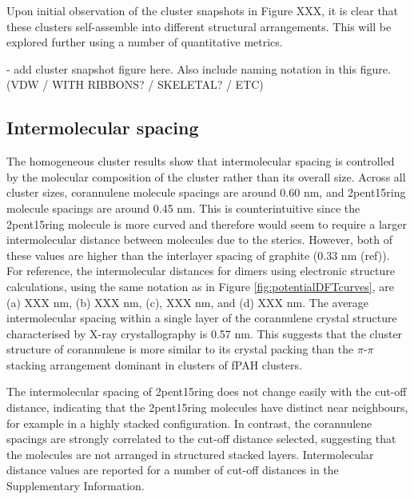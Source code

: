 
Upon initial observation of the cluster snapshots in Figure XXX, it is clear that these clusters self-assemble into different structural arrangements.  This will be explored further using a number of quantitative metrics.

- add cluster snapshot figure here. Also include naming notation in this figure. (VDW / WITH RIBBONS? / SKELETAL? / ETC)

\subsection{Intermolecular spacing}

The homogeneous cluster results show that intermolecular spacing is controlled by the molecular composition of the cluster rather than its overall size.  Across all cluster sizes, corannulene molecule spacings are around 0.60 nm, and 2pent15ring molecule spacings are around 0.45 nm.  This is counterintuitive since the 2pent15ring molecule is more curved and therefore would seem to require a larger intermolecular distance between molecules due to the sterics.  However, both of these values are higher than the interlayer spacing of graphite (0.33 nm (ref)). For reference, the intermolecular distances for dimers using electronic structure calculations, using the same notation as in Figure \ref{fig:potentialDFTcurves}, are (a) XXX nm, (b) XXX nm, (c), XXX nm, and (d) XXX nm. The average intermolecular spacing within a single layer of the corannulene crystal structure characterised by X-ray crystallography is 0.57 nm. This suggests that the cluster structure of corannulene is more similar to its crystal packing than the $\pi$-$\pi$ stacking arrangement dominant in clusters of fPAH clusters.

The intermolecular spacing of 2pent15ring does not change easily with the cut-off distance, indicating that the 2pent15ring molecules have distinct near neighbours, for example in a highly stacked configuration. In contrast, the corannulene spacings are strongly correlated to the cut-off distance selected, suggesting that the molecules are not arranged in structured stacked layers. Intermolecular distance values are reported for a number of cut-off distances in the Supplementary Information.

